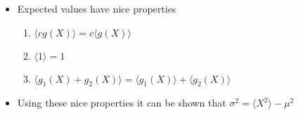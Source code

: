 \begin{itemize}
\item Expected values have nice properties
  \begin{enumerate}
    \item $\langle c g(X)\rangle =c\langle g(X)\rangle$
\item $\langle 1\rangle=1$
\item $\langle g_1(X)+g_2(X)\rangle=\langle g_1(X)\rangle+\langle g_2(X)\rangle$
  \end{enumerate}
  \item Using these nice properties it can be shown that $\sigma^2=\langle X^2\rangle -\mu^2$
  
\end{itemize}


